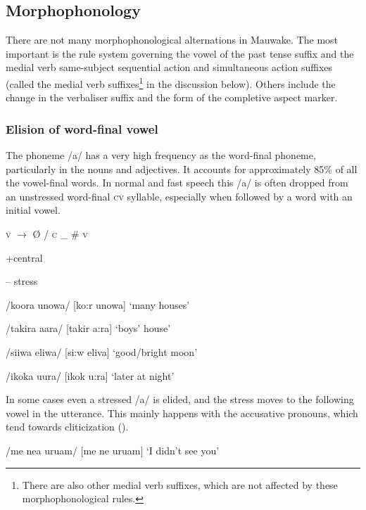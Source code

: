 \subsection{Morphophonology}

There are not many morphophonological alternations in Mauwake.  The most important is the rule system governing the vowel of the past tense suffix and the medial verb same-subject sequential action and simultaneous action suffixes (called the medial verb suffixes\footnote{There are also other medial verb suffixes, which are not  affected by these morphophonological rules.} in the discussion below).  Others include the change in the verbaliser suffix and the form of the completive aspect marker.

\subsubsection[Elision of word-final vowel]{Elision of word-final vowel}

The phoneme /a/ has a very high frequency as the word-final phoneme, particularly in the nouns and adjectives.  It accounts for approximately 85\% of all the vowel-final words.  In normal and fast speech this /a/ is often dropped from an unstressed word-final \textsc{cv} syllable, especially when followed by a word with an initial vowel. 

\textsc{v}    $\rightarrow $    {\O}  /  \textsc{c} \_  \#  \textsc{v}

+central

-- stress

/koora unowa/  [{{\textprimstress}ko:r  u{{\textprimstress}}nowa}]  `many houses'

/takira {\textphi}aara/  [ta{{\textprimstress}kir  {{\textprimstress}}}{\textphi}a:ra]  `boys' house'

/siiwa eliwa/  [{{\textprimstress}si:w  e{{\textprimstress}}liva}]  `good/bright moon'

/ikoka uura/  [i{{\textprimstress}kok  {{\textprimstress}}u:ra}]  `later at night'

In some cases even a stressed /a/ is elided, and the stress moves to the following vowel in the utterance.  This mainly happens with the accusative pronouns, which tend towards cliticization ().

/me ne{\textphi}a uru{\textphi}am/  [{{\textprimstress}me ne}{\textphi} {{\textprimstress}uru}{\textphi}am]  `I didn't see you'

